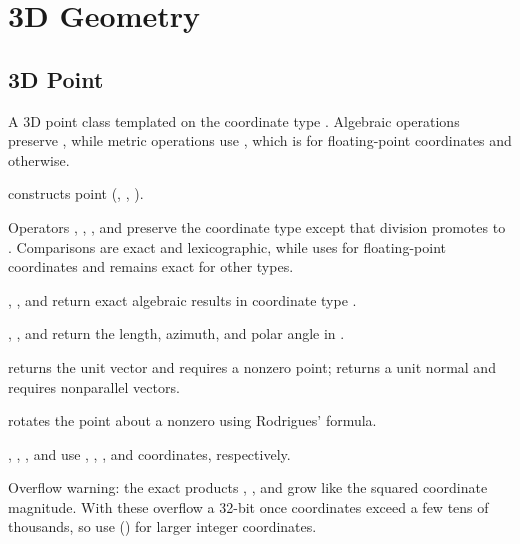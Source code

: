 \section{\texorpdfstring{3D Geometry}{7.5 3D Geometry}}
\setcounter{section}{5}
\setcounter{subsection}{0}
\subsection{3D Point}
\label{sec:7.5.1}
A 3D point class templated on the coordinate type . Algebraic operations preserve , while metric operations use , which is  for floating-point coordinates and  otherwise.

\begin{compactitem}
  \item {} constructs point (, , ).
  \item Operators \inlinecode{+}, \inlinecode{-}, \inlinecode{*}, and \inlinecode{/} preserve the coordinate type except that division promotes to . Comparisons are exact and lexicographic, while  uses  for floating-point coordinates and remains exact for other types.
  \item {}, , and  return exact algebraic results in coordinate type .
  \item {}, , and  return the length, azimuth, and polar angle in .
  \item {} returns the unit vector and requires a nonzero point;  returns a unit normal and requires nonparallel vectors.
  \item {} rotates the point about a nonzero  using Rodrigues' formula.
  \item {}, , , and  use , , , and  coordinates, respectively.
\end{compactitem}

Overflow warning: the exact products , , and  grow like the squared coordinate magnitude. With  these overflow a 32-bit  once coordinates exceed a few tens of thousands, so use  () for larger integer coordinates.

